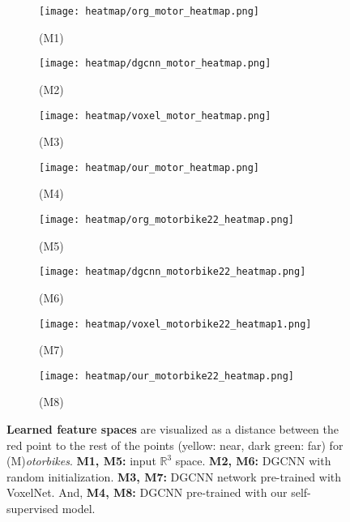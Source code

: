 \documentclass{article}
\begin{document}
\begin{figure}[h]
	\centering    
    	\begin{subfigure}{.45\textwidth}
		\centering
		\texttt{[image: heatmap/org\_motor\_heatmap.png]}
		\caption*{(M1)}
		\label{fig:heat17}
    \end{subfigure}\begin{subfigure}{.45\textwidth}
		\centering
		\texttt{[image: heatmap/dgcnn\_motor\_heatmap.png]}
		\caption*{(M2)}
		\label{fig:heat18}
    \end{subfigure}
    \begin{subfigure}{.45\textwidth}
		\centering
		\texttt{[image: heatmap/voxel\_motor\_heatmap.png]}
		\caption*{(M3)}
		\label{fig:heat19}
	\end{subfigure}\begin{subfigure}{.45\textwidth}
		\centering
		\texttt{[image: heatmap/our\_motor\_heatmap.png]}
		\caption*{(M4)}
		\label{fig:heat20}
    \end{subfigure}
	    	\begin{subfigure}{.45\textwidth}
		\centering
		\texttt{[image: heatmap/org\_motorbike22\_heatmap.png]}
		\caption*{(M5)}
		\label{fig:sub21}
    \end{subfigure}\begin{subfigure}{.45\textwidth}
		\centering
		\texttt{[image: heatmap/dgcnn\_motorbike22\_heatmap.png]}
		\caption*{(M6)}
		\label{fig:sub22}
    \end{subfigure}
    \begin{subfigure}{.45\textwidth}
		\centering
		\texttt{[image: heatmap/voxel\_motorbike22\_heatmap1.png]}
		\caption*{(M7)}
		\label{fig:sub23}
	\end{subfigure}\begin{subfigure}{.45\textwidth}
		\centering
		\texttt{[image: heatmap/our\_motorbike22\_heatmap.png]}
		\caption*{(M8)}
		\label{fig:sub24}
    \end{subfigure}
\caption{\textbf{Learned feature spaces} are visualized as a distance between the red point to the rest of the points (yellow: near, dark green: far) for (M)\emph{otorbikes}. \textbf{M1, M5:} input $\mathbb{R}^{3}$ space. \textbf{M2, M6:} DGCNN with random initialization. \textbf{M3, M7:} DGCNN network pre-trained with VoxelNet. And, \textbf{M4, M8:} DGCNN pre-trained with our self-supervised model.}
	\label{fig:heatmap_supp4}
\end{figure}
\end{document}
